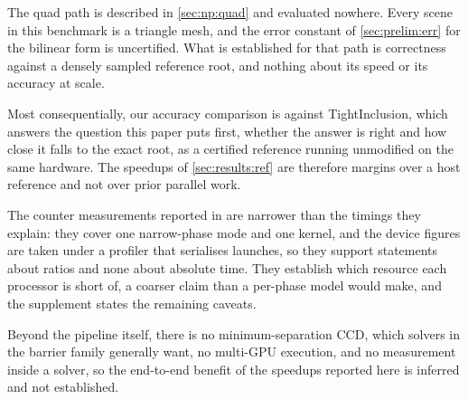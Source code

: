 The quad path is described in \cref{sec:np:quad} and evaluated nowhere. Every
scene in this benchmark is a triangle mesh, and the error constant of
\cref{sec:prelim:err} for the bilinear form is uncertified. What is established
for that path is correctness against a densely sampled reference root, and
nothing about its speed or its accuracy at scale.

Most consequentially, our accuracy comparison is against TightInclusion, which
answers the question this paper puts first, whether the answer is right and how
close it falls to the exact root, as a certified reference running unmodified on
the same hardware. The speedups of \cref{sec:results:ref} are therefore margins
over a host reference and not over prior parallel work.

The counter measurements reported in \supp{} are narrower than the timings they
explain: they cover one narrow-phase mode and one kernel, and the device figures
are taken under a profiler that serialises launches, so they support statements
about ratios and none about absolute time. They establish which resource each
processor is short of, a coarser claim than a per-phase model would make, and
the supplement states the remaining caveats.

Beyond the pipeline itself, there is no minimum-separation CCD, which solvers in
the barrier family generally want, no multi-GPU execution, and no measurement
inside a solver, so the end-to-end benefit of the speedups reported here is
inferred and not established.
